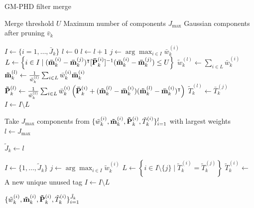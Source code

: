 \begin{algorithm}
\caption{GM-PHD filter merge}\label{alg:gm-phd:merge}
\begin{algorithmic}[1]
    \Require Merge threshold $U$
    \Require Maximum number of components $J_\mathrm{max}$
    \Require Gaussian components after pruning $\bar{v}_k$
    \item[]
        \State $I \gets \{ i = 1, \ldots, \bar{J}_{k}\}$
        \State $l \gets 0$
            \State $l \gets l + 1$
            \State $j \gets \arg \max_{i \in I} \bar{w}_{k}^{(i)}$
            \State $L \gets \left\{ i \in I \mid (\svecat{\bar{m}}{k}{(i)} - \svecat{\bar{m}}{k}{(j)})^\intercal [\svecat{\bar{P}}{k}{(i)}]^{-1} (\svecat{\bar{m}}{k}{(i)} - \svecat{\bar{m}}{k}{(j)}) \leq U \right\}$
            \State $\tilde{w}_k^{(l)} \gets \sum_{i \in L} \bar{w}_k^{(i)}$
            \State $\svecat{\tilde{m}}{k}{(l)} \gets \frac{1}{\tilde{w}_k^{(l)}} \sum_{i \in L} \bar{w}_k^{(i)} \svecat{\bar{m}}{k}{(i)}$
            \State $\svecat{\tilde{P}}{k}{(l)} \gets \frac{1}{\tilde{w}_k^{(l)}} \sum_{i \in L} \bar{w}_k^{(i)} \left( \svecat{\bar{P}}{k}{(i)} + (\svecat{\tilde{m}}{k}{(l)} - \svecat{\bar{m}}{k}{(i)})(\svecat{\tilde{m}}{k}{(l)} - \svecat{\bar{m}}{k}{(i)})^\intercal \right)$
            \State $\tilde{T}_k^{(l)} \gets \bar{T}_k^{(j)}$
            \State $I \gets I \setminus L$
        \EndWhile

            \State Take $J_{\mathrm{max}}$ components from $\{ \tilde{w}_{k}^{(i)}, \vecat{\tilde{m}}{k}^{(i)}, \vecat{\tilde{P}}{k}^{(i)}, \tilde{T}_{k}^{(i)}\}_{i=1}^{l}$ with largest weights
            \State $l \gets J_{\mathrm{max}}$
        \EndIf

        \State $\tilde{J}_k \gets l$

        \State $I \gets \{ 1, \ldots, \tilde{J}_{k} \}$
         
            \State $j \gets \arg \max_{i \in I} \tilde{w}_{k}^{(i)}$
            \State $L \gets \left\{ i \in I \setminus \{j\} \mid \tilde{T}_k^{(i)} = \tilde{T}_k^{(j)} \right\}$
                \State $\tilde{T}_k^{(i)} \gets$ A new unique unused tag
            \EndFor
            \State $I \gets I \setminus L$
        \EndWhile
        
        \State \Return $\{ \tilde{w}_{k}^{(i)}, \vecat{\tilde{m}}{k}^{(i)}, \vecat{\tilde{P}}{k}^{(i)}, \tilde{T}_{k}^{(i)}\}_{i=1}^{\tilde{J}_{k}}$
    \EndProcedure
\end{algorithmic}
\end{algorithm}


